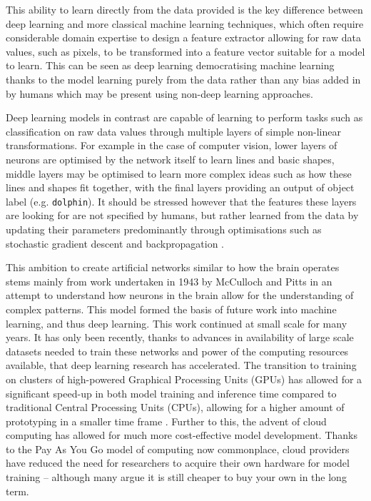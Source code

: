 This ability to learn directly from the data provided is the key difference between deep learning and more classical machine learning techniques, which often require considerable domain expertise to design a feature extractor allowing for raw data values, such as pixels, to be transformed into a feature vector suitable for a model to learn. This can be seen as deep learning democratising machine learning thanks to the model learning purely from the data rather than any bias added in by humans which may be present using non-deep learning approaches.

Deep learning models in contrast are capable of learning to perform tasks such as classification on raw data values through multiple layers of simple non-linear transformations. For example in the case of computer vision, lower layers of neurons are optimised by the network itself to learn lines and basic shapes, middle layers may be optimised to learn more complex ideas such as how these lines and shapes fit together, with the final layers providing an output of object label (e.g. \texttt{dolphin}). It should be stressed however that the features these layers are looking for are not specified by humans, but rather learned from the data by updating their parameters predominantly through optimisations such as stochastic gradient descent and backpropagation \cite{hecht-nielsen_iii.3_1992}.

This ambition to create artificial networks similar to how the brain operates stems mainly from work undertaken in 1943 by McCulloch and Pitts \cite{mcculloch_logical_1943} in an attempt to understand how neurons in the brain allow for the understanding of complex patterns. This model formed the basis of future work into machine learning, and thus deep learning. This work continued at small scale for many years. It has only been recently, thanks to advances in availability of large scale datasets needed to train these networks and power of the computing resources available, that deep learning research has accelerated. The transition to training on clusters of high-powered Graphical Processing Units (GPUs) has allowed for a significant speed-up in both model training and inference time compared to traditional Central Processing Units (CPUs), allowing for a higher amount of prototyping in a smaller time frame \cite{luo_artificial_2005}. Further to this, the advent of cloud computing has allowed for much more cost-effective model development. Thanks to the Pay As You Go model of computing now commonplace, cloud providers have reduced the need for researchers to acquire their own hardware for model training -- although many argue it is still cheaper to buy your own in the long term. 

